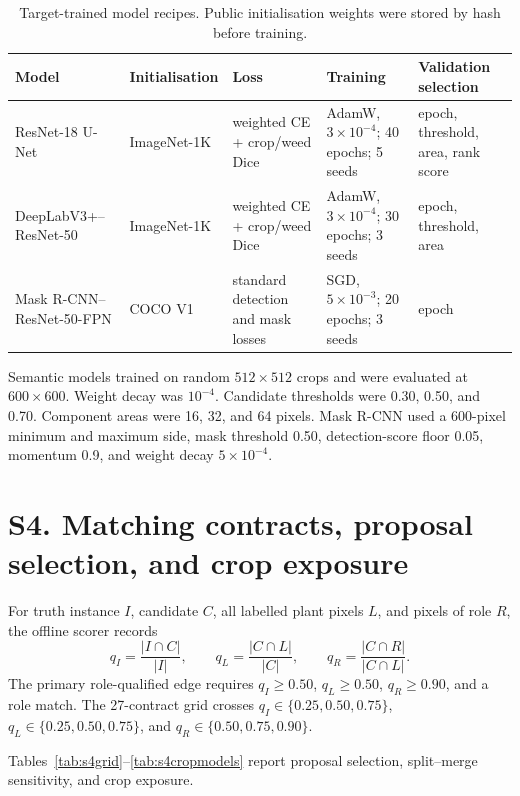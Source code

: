 \documentclass[preprint,12pt]{elsarticle}
\begin{document}
\begin{table}[htbp]
\centering
\caption{Target-trained model recipes. Public initialisation weights were stored by hash before training.}
\label{tab:s3models}
\footnotesize
\begin{tabularx}{\textwidth}{L{2.8cm}L{2.1cm}X L{2.8cm}X}
\toprule
Model & Initialisation & Loss & Training & Validation selection \\
\midrule
ResNet-18 U-Net & ImageNet-1K & weighted CE + crop/weed Dice & AdamW, $3\!\times\!10^{-4}$; 40 epochs; 5 seeds & epoch, threshold, area, rank score \\
DeepLabV3+--ResNet-50 & ImageNet-1K & weighted CE + crop/weed Dice & AdamW, $3\!\times\!10^{-4}$; 30 epochs; 3 seeds & epoch, threshold, area \\
Mask R-CNN--ResNet-50-FPN & COCO V1 & standard detection and mask losses & SGD, $5\!\times\!10^{-3}$; 20 epochs; 3 seeds & epoch \\
\bottomrule
\end{tabularx}
\end{table}

Semantic models trained on random $512\times512$ crops and were evaluated at $600\times600$. Weight decay was $10^{-4}$. Candidate thresholds were 0.30, 0.50, and 0.70. Component areas were 16, 32, and 64 pixels. Mask R-CNN used a 600-pixel minimum and maximum side, mask threshold 0.50, detection-score floor 0.05, momentum 0.9, and weight decay $5\times10^{-4}$.

\section{S4. Matching contracts, proposal selection, and crop exposure}

For truth instance $I$, candidate $C$, all labelled plant pixels $L$, and pixels of role $R$, the offline scorer records
\[
q_I=\frac{|I\cap C|}{|I|},\qquad
q_L=\frac{|C\cap L|}{|C|},\qquad
q_R=\frac{|C\cap R|}{|C\cap L|}.
\]
The primary role-qualified edge requires $q_I\ge0.50$, $q_L\ge0.50$, $q_R\ge0.90$, and a role match. The 27-contract grid crosses $q_I\in\{0.25,0.50,0.75\}$, $q_L\in\{0.25,0.50,0.75\}$, and $q_R\in\{0.50,0.75,0.90\}$.

Tables~\ref{tab:s4grid}--\ref{tab:s4cropmodels} report proposal selection, split--merge sensitivity, and crop exposure.
\end{document}
